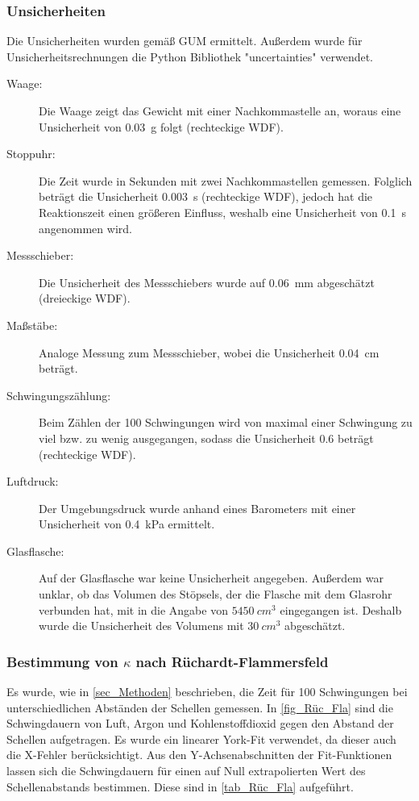 \documentclass[
	a4paper,
	12pt,
	pagesize,
	ngerman
]{scrartcl}
\begin{document}
	\subsubsection{Unsicherheiten} %
	Die Unsicherheiten wurden gemäß GUM ermittelt. 
	Außerdem wurde für Unsicherheitsrechnungen die Python Bibliothek "uncertainties" verwendet.
	\begin{description}
		\item[Waage:] Die Waage zeigt das Gewicht mit einer Nachkommastelle an, woraus eine Unsicherheit von \SI{0,03}{g} folgt (rechteckige WDF).
		\item[Stoppuhr:] Die Zeit wurde in Sekunden mit zwei Nachkommastellen gemessen. Folglich beträgt die Unsicherheit \SI{0,003}{s} (rechteckige WDF), jedoch hat die Reaktionszeit einen größeren Einfluss, weshalb eine Unsicherheit von \SI{0,1}{s} angenommen wird.
		\item[Messschieber:] Die Unsicherheit des Messschiebers wurde auf \SI{0,06}{mm}  abgeschätzt (dreieckige WDF).
		\item[Maßstäbe:]  Analoge Messung zum Messschieber, wobei die Unsicherheit \SI{0,04}{cm} beträgt.
		\item[Schwingungszählung:] Beim Zählen der 100 Schwingungen wird von maximal einer Schwingung zu viel bzw. zu wenig ausgegangen, sodass die Unsicherheit \SI{0,6}{} beträgt (rechteckige WDF).
		\item[Luftdruck:] Der Umgebungsdruck wurde anhand eines Barometers mit einer Unsicherheit von \SI{0,4}{kPa} ermittelt.
		\item[Glasflasche:] Auf der Glasflasche war keine Unsicherheit angegeben. Außerdem war unklar, ob das Volumen des Stöpsels, der die Flasche mit dem Glasrohr verbunden hat, mit in die Angabe von $\SI{5450}{cm^3}$ eingegangen ist. Deshalb wurde die Unsicherheit des Volumens mit $\SI{30}{cm^3}$ abgeschätzt.
	\end{description}
	
	\subsubsection{Bestimmung von $\kappa$ nach Rüchardt-Flammersfeld}
	Es wurde, wie in \cref{sec_Methoden} beschrieben, die Zeit für 100 Schwingungen bei unterschiedlichen Abständen der Schellen gemessen.
	In \cref{fig_Rüc_Fla} sind die Schwingdauern von Luft, Argon und Kohlenstoffdioxid gegen den Abstand der Schellen aufgetragen. 
	Es wurde ein linearer York-Fit verwendet, da dieser auch die X-Fehler berücksichtigt.
	Aus den Y-Achsenabschnitten der Fit-Funktionen lassen sich die Schwingdauern für einen auf Null extrapolierten Wert des Schellenabstands bestimmen.
	Diese sind in \cref{tab_Rüc_Fla} aufgeführt.
	
\end{document}
